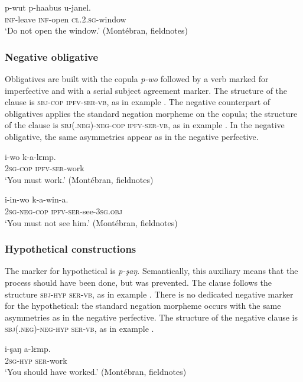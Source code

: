 \documentclass[output=paper,colorlinks,citecolor=brown]{langscibook}
\begin{document}
\ea\label{ex:mank:30}
    \gll p-wut p-haabus u-janel.\\
         \textsc{inf}-leave \textsc{inf}-open \textsc{cl.2.sg}-window\\
    \glt ‘Do not open the window.’ (Montébran, fieldnotes)
\z

\subsubsection{Negative obligative}\label{sec:mank:2.2.2}

Obligatives are built with the copula \textit{p-wo} followed by a verb marked for imperfective and with a serial subject agreement marker. The structure of the clause is \textsc{sbj-cop} \textsc{ipfv-ser-vb}, as in example . The negative counterpart of obligatives applies the standard negation morpheme on the copula; the structure of the clause is \textsc{sbj(.neg){}-neg-cop ipfv-ser-vb}, as in example . In the negative obligative, the same asymmetries appear as in the negative perfective.


\ea\label{ex:mank:31}
    \gll i-wo k-a-lɛmp. \\
         \textsc{2sg-cop} \textsc{ipfv-ser}-work \\
    \glt ‘You must work.’ (Montébran, fieldnotes)
\z

\ea\label{ex:mank:32}
    \gll i-in-wo k-a-win-a. \\
         \textsc{2sg{}-neg-cop} \textsc{ipfv-ser}-see-\textsc{3sg.obj} \\
    \glt ‘You must not see him.’ (Montébran, fieldnotes)
\z

\subsubsection{Hypothetical constructions}\label{sec:mank:2.2.3}

The marker for hypothetical is \textit{p-şaŋ}. Semantically, this auxiliary means that the process should have been done, but was prevented. The clause follows the structure \textsc{sbj-hyp} \textsc{ser-vb}, as in example . There is no dedicated negative marker for the hypothetical: the standard negation morpheme occurs with the same asymmetries as in the negative perfective. The structure of the negative clause is \textsc{sbj(.neg){}-neg-hyp ser-vb}, as in example .

\ea\label{ex:mank:33}
    \gll i-şaŋ a-lɛmp. \\
         \textsc{2sg-hyp} \textsc{ser}-work \\
    \glt ‘You should have worked.’ (Montébran, fieldnotes)
\z
\end{document}
